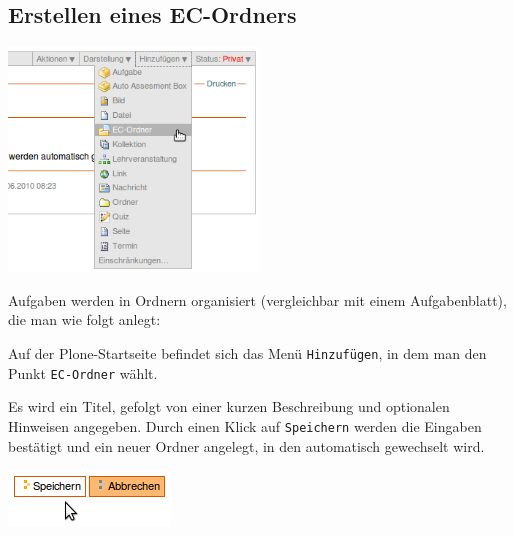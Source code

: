 \documentclass[a4paper]{scrartcl}
\newcommand{\anf}[1]{\glqq{}#1\grqq{}}
\begin{document}
	  \subsection{Erstellen eines EC-Ordners}
	    \begin{center}
        \captionsetup{type=figure}
	      \includegraphics[width=0.5\textwidth]{images/AddingECFolder.png}
	      \label{fig:addingECFolder}
      \end{center}
      Aufgaben werden in Ordnern organisiert (vergleichbar mit einem Aufgabenblatt), die man wie folgt anlegt:
      
      Auf der Plone-Startseite befindet sich das Menü \anf{\texttt{Hinzufügen}}, in dem man den Punkt \anf{\texttt{EC-Ordner}} wählt.
      
      Es wird ein Titel, gefolgt von einer kurzen Beschreibung und optionalen Hinweisen angegeben. Durch einen Klick auf \anf{\texttt{Speichern}} werden die Eingaben bestätigt und ein neuer Ordner angelegt, in den automatisch gewechselt wird.
      \begin{center}
        \captionsetup{type=figure}
	      \includegraphics[scale=0.5]{images/Save.png}
	      \label{fig:save}
      \end{center}
	  
\end{document}
